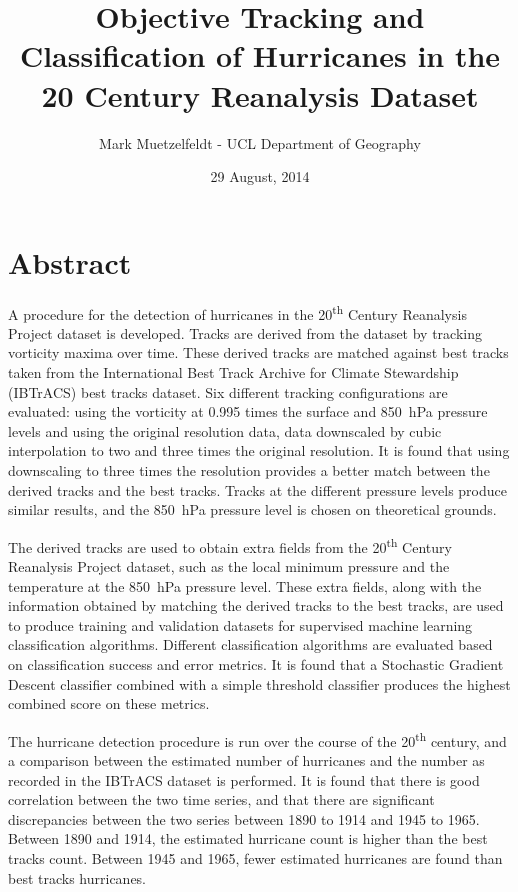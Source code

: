 \documentclass[pdftex,12pt,a4paper]{report}
\title{Objective Tracking and Classification of Hurricanes in the 20\ts{th} Century Reanalysis Dataset}
\author{Mark Muetzelfeldt - UCL Department of Geography}
\date{29 August, 2014}
\newcommand{\ts}{\textsuperscript}
\begin{document}


\clearpage
\thispagestyle{empty}
\null
\addtocounter{page}{-1}%
\newpage

\onehalfspacing
\section*{Abstract}

A procedure for the detection of hurricanes in the 20\ts{th} Century Reanalysis Project dataset is
developed. Tracks are derived from the dataset by tracking vorticity maxima over time. These derived
tracks are matched against best tracks taken from the International Best Track Archive for Climate
Stewardship (IBTrACS) best tracks dataset. Six different tracking configurations are evaluated:
using the vorticity at 0.995 times the surface and \SI{850}{hPa} pressure levels and using the
original resolution data, data downscaled by cubic interpolation to two and three times the original
resolution. It is found that using downscaling to three times the resolution provides a better match
between the derived tracks and the best tracks. Tracks at the different pressure levels produce
similar results, and the \SI{850}{hPa} pressure level is chosen on theoretical grounds.

The derived tracks are used to obtain extra fields from the 20\ts{th} Century Reanalysis
Project dataset, such as the local minimum pressure and the temperature at the \SI{850}{hPa}
pressure level. These extra fields, along with the information obtained by matching the derived
tracks to the best tracks, are used to produce training and validation datasets for supervised
machine learning classification algorithms. Different classification algorithms are evaluated based
on classification success and error metrics. It is found that a Stochastic Gradient Descent
classifier combined with a simple threshold classifier produces the highest combined score on these
metrics.

The hurricane detection procedure is run over the course of the 20\ts{th} century, and a comparison
between the estimated number of hurricanes and the number as recorded in the IBTrACS dataset is
performed. It is found that there is good correlation between the two time series, and that there
are significant discrepancies between the two series between 1890 to 1914 and 1945 to 1965. Between
1890 and 1914, the estimated hurricane count is higher than the best tracks count. Between 1945 and
1965, fewer estimated hurricanes are found than best tracks hurricanes. 
\end{document}
